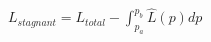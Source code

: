 \documentclass[10pt]{article}
\begin{document}
$L_{stagnant} = L_{total} - \int_{p_{a}}^{p_{b}}\hat{L}(p)dp$
\end{document}
